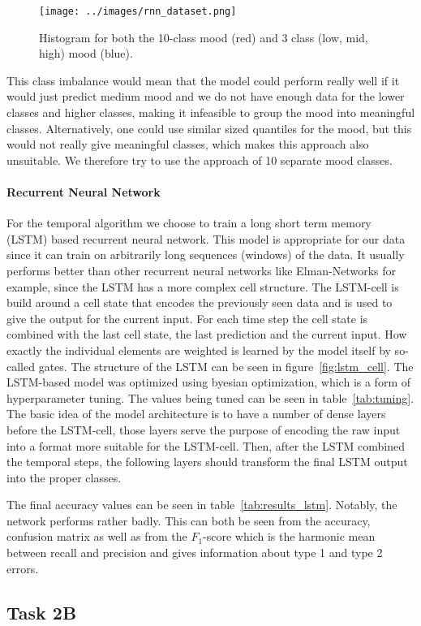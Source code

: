 \begin{figure}
    \centering
    \texttt{[image: ../images/rnn\_dataset.png]}
    \caption{Histogram for both the 10-class mood (red) and 3 class (low, mid, high) mood (blue).}
    \label{fig:mood_bag_hist}
\end{figure}
This class imbalance would mean that the model could perform really well if it would just predict medium mood and we do not
have enough data for the lower classes and higher classes, making it infeasible to group the mood into meaningful classes.
Alternatively, one could use similar sized quantiles for the mood, but this would not really give meaningful classes,
which makes this approach also unsuitable. We therefore try to use the approach of 10 separate mood classes.

\paragraph*{Recurrent Neural Network}
For the temporal algorithm we choose to train a long short term memory (LSTM) based recurrent neural network. This model is
appropriate for our data since it can train on arbitrarily long sequences (windows) of the data. It usually performs better
than other recurrent neural networks like Elman-Networks for example, since the LSTM has a more complex cell structure.
The LSTM-cell is build around a cell state that encodes the previously seen data and is used to give the output for the current
input. For each time step the cell state is combined with the last cell state, the last prediction and the current input.
How exactly the individual elements are weighted is learned by the model itself by so-called gates. The structure of the 
LSTM can be seen in figure~\ref{fig:lstm_cell}. The LSTM-based model was optimized using byesian optimization, which is a form
of hyperparameter tuning. The values being tuned can be seen in table~\ref{tab:tuning}. The basic idea of the model
architecture is to have a number of dense layers before the LSTM-cell, those layers serve the purpose of encoding
the raw input into a format more suitable for the LSTM-cell. Then, after the LSTM combined the temporal steps, the following
layers should transform the final LSTM output into the proper classes. 

The final accuracy values can be seen in table~\ref{tab:results_lstm}. Notably, the network performs rather badly. This
can both be seen from the accuracy, confusion matrix as well as from the $F_1$-score which is the harmonic mean between 
recall and precision and gives information about type 1 and type 2 errors.


\subsection{Task 2B}